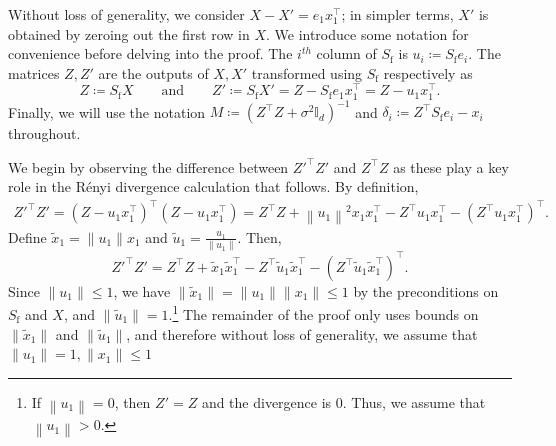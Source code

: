 \documentclass[11pt]{article}
\theoremstyle{definition}
\theoremstyle{plain}
\providecommand{\brI}{\mathbb{I}}
\newcommand{\Norm}[1]{\left\| #1 \right\|}
\providecommand{\norm}[1]{\Norm{#1}}
\begin{document}
Without loss of generality, we consider $X - X' = e_1 x^{\top}_1$; in simpler terms, $X'$ is obtained by zeroing out the first row in $X$.
We introduce some notation for convenience before delving into the proof.
The \(i^{th}\) column of \(S_{\mathrm{f}}\) is \(u_{i}\coloneq S_{\mathrm{f}}e_{i}\).
The matrices \(Z, Z'\) are the outputs of \(X, X'\) transformed using \(S_{\mathrm{f}}\) respectively as
\begin{equation}
    Z\coloneq S_{\mathrm{f}}X \qquad \text{and} \qquad Z'\coloneq S_{\mathrm{f}}X' = Z - S_{\mathrm{f}}e_1x^{\top}_1 = Z - u_1x^{\top}_1.
\end{equation}
Finally, we will use the notation $M\coloneq (Z^{\top}Z + \sigma^{2}\brI_{d})^{-1}$ and $\delta_i\coloneq Z^{\top}S_{\mathrm{f}}e_i - x_i$ throughout. 

We begin by observing the difference between \(Z'^{\top}Z'\) and \(Z^{\top}Z\) as these play a key role in the R\'{e}nyi divergence calculation that follows.
By definition,
\begin{align}
    Z'^{\top}Z' = \left(Z - u_1 x^{\top}_1\right)^{\top}\left(Z - u_1x^{\top}_1\right) = Z^{\top}Z + \norm{u_1}^2x_1x^{\top}_1 - Z^{\top}u_1x^{\top}_1 - \left(Z^{\top}u_1x^{\top}_1\right)^{\top}.
\end{align}
Define \(\widetilde{x}_{1} = \|u_{1}\| x_{1}\) and \(\widetilde{u}_{1} = \frac{u_{1}}{\|u_{1}\|}\).
Then,
\begin{equation*}
    Z'^{\top}Z' = Z^{\top}Z + \widetilde{x}_{1}\widetilde{x}_{1}^{\top} - Z^{\top}\widetilde{u}_{1}\widetilde{x}_{1}^{\top} - (Z^{\top}\widetilde{u}_{1}\widetilde{x}_{1}^{\top})^{\top}.
\end{equation*}
Since \(\|u_{1}\| \leq 1\), we have \(\|\widetilde{x}_{1}\| = \|u_{1}\| \|x_{1}\| \leq 1\) by the preconditions on \(S_{\mathrm{f}}\) and \(X\), and \(\|\widetilde{u}_{1}\| = 1\).\footnote{If $\norm{u_1}=0$, then $Z' = Z$ and the divergence is $0$. Thus, we assume that $\norm{u_1} > 0$. }
The remainder of the proof only uses bounds on \(\|\widetilde{x}_{1}\|\) and \(\|\widetilde{u}_{1}\|\), and therefore without loss of generality, we assume that \(\|u_{1}\| = 1, \|x_{1}\| \leq 1\)
\end{document}
